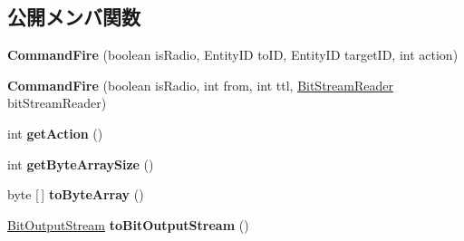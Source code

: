 \subsection*{公開メンバ関数}
\begin{DoxyCompactItemize}
\item 
\hypertarget{classadf_1_1agent_1_1communication_1_1standard_1_1bundle_1_1centralized_1_1CommandFire_a7bae68e663f358632f953822a606a57e}{}\label{classadf_1_1agent_1_1communication_1_1standard_1_1bundle_1_1centralized_1_1CommandFire_a7bae68e663f358632f953822a606a57e} 
{\bfseries Command\+Fire} (boolean is\+Radio, Entity\+ID to\+ID, Entity\+ID target\+ID, int action)
\item 
\hypertarget{classadf_1_1agent_1_1communication_1_1standard_1_1bundle_1_1centralized_1_1CommandFire_a5ff648c1725987c7a6e368b0e62d109a}{}\label{classadf_1_1agent_1_1communication_1_1standard_1_1bundle_1_1centralized_1_1CommandFire_a5ff648c1725987c7a6e368b0e62d109a} 
{\bfseries Command\+Fire} (boolean is\+Radio, int from, int ttl, \hyperlink{classadf_1_1component_1_1communication_1_1util_1_1BitStreamReader}{Bit\+Stream\+Reader} bit\+Stream\+Reader)
\item 
\hypertarget{classadf_1_1agent_1_1communication_1_1standard_1_1bundle_1_1centralized_1_1CommandFire_a622b7ca860cc5f8997344f4a63c226f8}{}\label{classadf_1_1agent_1_1communication_1_1standard_1_1bundle_1_1centralized_1_1CommandFire_a622b7ca860cc5f8997344f4a63c226f8} 
int {\bfseries get\+Action} ()
\item 
\hypertarget{classadf_1_1agent_1_1communication_1_1standard_1_1bundle_1_1centralized_1_1CommandFire_af29ec7c8d3904c6b61473dc4ecf05b13}{}\label{classadf_1_1agent_1_1communication_1_1standard_1_1bundle_1_1centralized_1_1CommandFire_af29ec7c8d3904c6b61473dc4ecf05b13} 
int {\bfseries get\+Byte\+Array\+Size} ()
\item 
\hypertarget{classadf_1_1agent_1_1communication_1_1standard_1_1bundle_1_1centralized_1_1CommandFire_a36bf511b93184bd0e2d272ad89f73932}{}\label{classadf_1_1agent_1_1communication_1_1standard_1_1bundle_1_1centralized_1_1CommandFire_a36bf511b93184bd0e2d272ad89f73932} 
byte \mbox{[}$\,$\mbox{]} {\bfseries to\+Byte\+Array} ()
\item 
\hypertarget{classadf_1_1agent_1_1communication_1_1standard_1_1bundle_1_1centralized_1_1CommandFire_a6f450b71c037caca59472c7695a649af}{}\label{classadf_1_1agent_1_1communication_1_1standard_1_1bundle_1_1centralized_1_1CommandFire_a6f450b71c037caca59472c7695a649af} 
\hyperlink{classadf_1_1component_1_1communication_1_1util_1_1BitOutputStream}{Bit\+Output\+Stream} {\bfseries to\+Bit\+Output\+Stream} ()

\end{DoxyCompactItemize}
